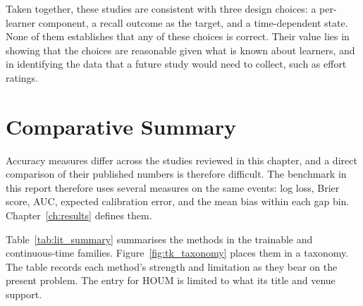 Taken together, these studies are consistent with three design choices: a per-learner component, a recall
outcome as the target, and a time-dependent state. None of them establishes that any of these choices is correct. Their
value lies in showing that the choices are reasonable given what is known about learners, and in identifying
the data that a future study would need to collect, such as effort ratings.

\section{Comparative Summary}
\label{sec:lit-summary}

Accuracy measures differ across the studies reviewed in this chapter, and a direct comparison of their
published numbers is therefore difficult. The benchmark in this report therefore uses several measures on the
same events: log loss, Brier score, AUC, expected calibration error, and the mean bias within each gap bin.
Chapter~\ref{ch:results} defines them.

Table~\ref{tab:lit_summary} summarises the methods in the trainable and continuous-time families. Figure~\ref{fig:tk_taxonomy}
places them in a taxonomy. The table records each method's strength and limitation as they bear on the present
problem. The entry for HOUM is limited to what its title and venue support.

